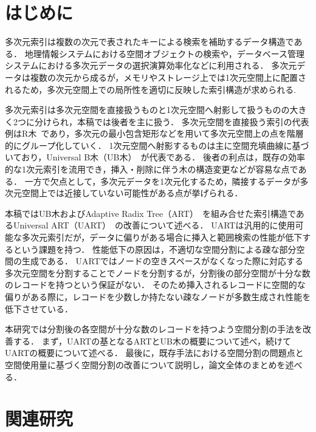 
\chapter{はじめに}

多次元索引は複数の次元で表されたキーによる検索を補助するデータ構造である．
地理情報システムにおける空間オブジェクトの検索や，データベース管理システムにおける多次元データの選択演算効率化などに利用される．
多次元データは複数の次元から成るが，メモリやストレージ上では1次元空間上に配置されるため，多次元空間上での局所性を適切に反映した索引構造が求められる.

多次元索引は多次元空間を直接扱うものと1次元空間へ射影して扱うものの大きく2つに分けられ，本稿では後者を主に扱う．
多次元空間を直接扱う索引の代表例はR木~\cite{sigmod:Beckmann1990}であり，多次元の最小包含矩形などを用いて多次元空間上の点を階層的にグループ化していく．
1次元空間へ射影するものは主に空間充填曲線に基づいており，Universal B木（UB木）~\cite{wwca:Bayer1997}が代表である．
後者の利点は，既存の効率的な1次元索引を流用でき，挿入・削除に伴う木の構造変更などが容易な点である．
一方で欠点として，多次元データを1次元化するため，隣接するデータが多次元空間上では近接していない可能性がある点が挙げられる．

本稿ではUB木およびAdaptive Radix Tree（ART）~\cite{icde:Leis2013}を組み合せた索引構造であるUniversal ART（UART）~\cite{deim:Suzuki2023}の改善について述べる．
UARTは汎用的に使用可能な多次元索引だが，データに偏りがある場合に挿入と範囲検索の性能が低下するという課題を持つ．
性能低下の原因は，不適切な空間分割による疎な部分空間の生成である．
UARTではノードの空きスペースがなくなった際に対応する多次元空間を分割することでノードを分割するが，分割後の部分空間が十分な数のレコードを持つという保証がない．
そのため挿入されるレコードに空間的な偏りがある際に，レコードを少数しか持たない疎なノードが多数生成され性能を低下させている．

本研究では分割後の各空間が十分な数のレコードを持つよう空間分割の手法を改善する．
まず，UARTの基となるARTとUB木の概要について述べ，続けてUARTの概要について述べる．
最後に，既存手法における空間分割の問題点と空間使用量に基づく空間分割の改善について説明し，論文全体のまとめを述べる．




\chapter{関連研究}

